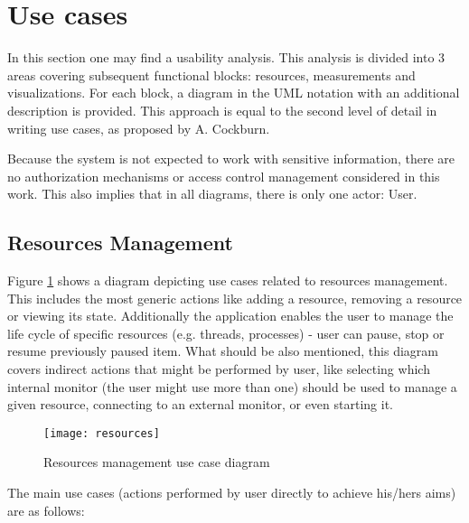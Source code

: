 %
\section{Use cases}
\label{sec:ch4_usecases}

In this section one may find a usability analysis. This analysis is divided into 3 areas covering subsequent functional blocks: resources, measurements and visualizations. For each block, a diagram in the UML notation with an additional description is provided. This approach is equal to the second level of detail in writing use cases, as proposed by A. Cockburn\cite{0201702258}. 

Because the system is not expected to work with sensitive information, there are no authorization mechanisms or access control management considered in this work. This also implies that in all diagrams, there is only one actor: User.

\subsection{Resources Management}
\label{subsec:resources_mgmnt}

Figure \ref{fig:usecase_resources} shows a diagram depicting use cases related to resources management. This includes the most generic actions like adding a resource, removing a resource or viewing its state. Additionally the application enables the user to manage the life cycle of specific resources (e.g. threads, processes) - user can pause, stop or resume previously paused item. What should be also mentioned, this diagram covers indirect actions that might be performed by user, like selecting which internal monitor (the user might use more than one) should be used to manage a given resource, connecting to an external monitor, or even starting it.

\begin{figure}[ht]
\centering
\texttt{[image: resources]}
\caption{Resources management use case diagram}
\label{fig:usecase_resources}
\end{figure}

The main use cases (actions performed by user directly to achieve his/hers aims) are as follows:

